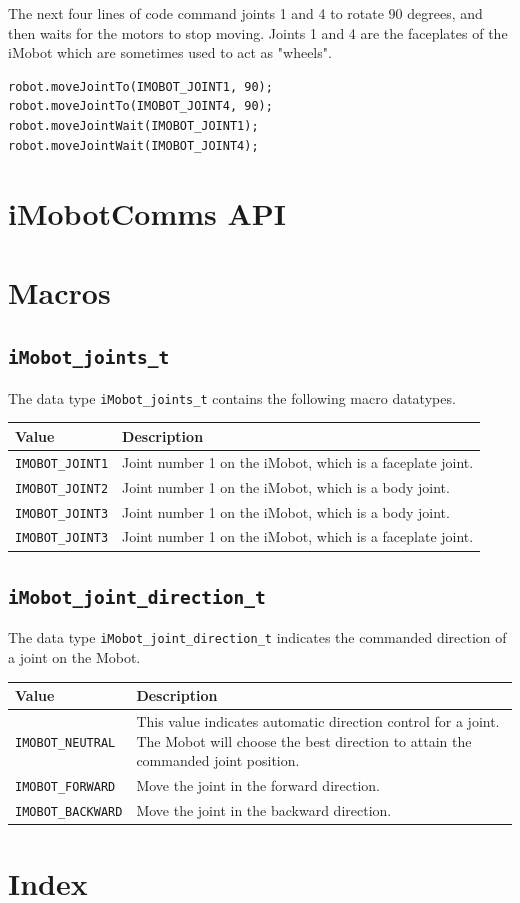 \documentclass{article}
\begin{document}
The next four lines of code command joints 1 and 4 to rotate 90 degrees, and
then waits for the motors to stop moving. Joints 1 and 4 are the faceplates
of the iMobot which are sometimes used to act as "wheels".
\begin{verbatim}
robot.moveJointTo(IMOBOT_JOINT1, 90);
robot.moveJointTo(IMOBOT_JOINT4, 90);
robot.moveJointWait(IMOBOT_JOINT1);
robot.moveJointWait(IMOBOT_JOINT4);
\end{verbatim}

\newpage
\appendix
\section{iMobotComms API}


\section{Macros}

\subsection{\texttt{iMobot\_joints\_t}}
The data type \texttt{iMobot\_joints\_t} contains the following macro datatypes.\\

\begin{tabular}{p{3cm}p{7cm}} \hline 
Value & Description \\
\hline 
\texttt{IMOBOT\_JOINT1} & Joint number 1 on the iMobot, which is a faceplate joint. \\
\texttt{IMOBOT\_JOINT2} & Joint number 1 on the iMobot, which is a body joint. \\
\texttt{IMOBOT\_JOINT3} & Joint number 1 on the iMobot, which is a body joint. \\
\texttt{IMOBOT\_JOINT3} & Joint number 1 on the iMobot, which is a faceplate joint. 
\end{tabular}

\subsection{\texttt{iMobot\_joint\_direction\_t}}
The data type \texttt{iMobot\_joint\_direction\_t} indicates the commanded direction 
of a joint on the Mobot.

\begin{tabular}{p{3cm}p{7cm}} \hline 
Value & Description \\
\hline 
\texttt{IMOBOT\_NEUTRAL} & This value indicates automatic direction control for a joint. 
The Mobot will choose the best direction to attain the commanded joint position. \\
\texttt{IMOBOT\_FORWARD} & Move the joint in the forward direction. \\
\texttt{IMOBOT\_BACKWARD} & Move the joint in the backward direction. \\
\end{tabular}
\section{Index}
\printindex
\end{document}
